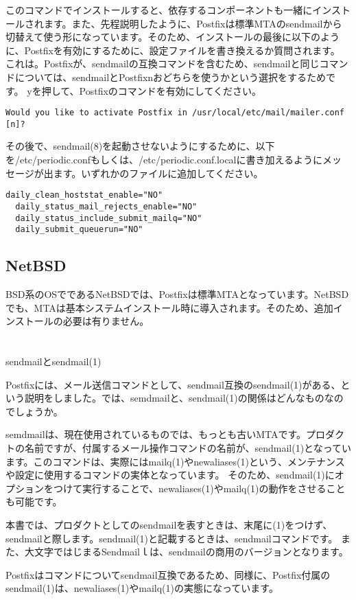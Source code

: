 このコマンドでインストールすると、依存するコンポーネントも一緒にインストールされます。また、先程説明したように、Postfixは標準MTAのsendmailから切替えて使う形になっています。そのため、インストールの最後に以下のように、Postfixを有効にするために、設定ファイルを書き換えるか質問されます。
これは。Postfixが、sendmailの互換コマンドを含むため、sendmailと同じコマンドについては、sendmailとPostfixnおどちらを使うかという選択をするためです。
yを押して、Postfixのコマンドを有効にしてください。

\begin{verbatim}
Would you like to activate Postfix in /usr/local/etc/mail/mailer.conf [n]?
\end{verbatim}


その後で、sendmail(8)を起動させないようにするために、以下を/etc/periodic.confもしくは、/etc/periodic.conf.localに書き加えるようにメッセージが出ます。いずれかのファイルに追加してください。

\begin{lstlisting}[basicstyle=\ttfamily\footnotesize, frame=single]
  daily_clean_hoststat_enable="NO"
  daily_status_mail_rejects_enable="NO"
  daily_status_include_submit_mailq="NO"
  daily_submit_queuerun="NO"
\end{lstlisting}



\subsection{NetBSD}
BSD系のOSでであるNetBSDでは、Postfixは標準MTAとなっています。NetBSDでも、MTAは基本システムインストール時に導入されます。そのため、追加インストールの必要は有りません。

\section*{}
\begin{itembox}[l]{sendmailとsendmail(1)}

Postfixには、メール送信コマンドとして、sendmail互換のsendmail(1)がある、という説明をしました。では、semdmailと、sendmail(1)の関係はどんなものなのでしょうか。

semdmailは、現在使用されているものでは、もっとも古いMTAです。プロダクトの名前ですが、付属するメール操作コマンドの名前が、sendmail(1)となっています。このコマンドは、実際にはmailq(1)やnewaliases(1)という、メンテナンスや設定に使用するコマンドの実体となっています。
そのため、sendmail(1)にオプションをつけて実行することで、newaliases(1)やmailq(1)の動作をさせることも可能です。

本書では、プロダクトとしてのsendmailを表すときは、末尾に(1)をつけず、sendmailと際します。sendmail(1)と記載するときは、sendmailコマンドです。
また、大文字ではじまるSendmailｌは、sendmailの商用のバージョンとなります。

Postfixはコマンドについてsendmail互換であるため、同様に、Postfix付属のsendmail(1)は、newaliases(1)やmailq(1)の実態になっています。

\end{itembox}


